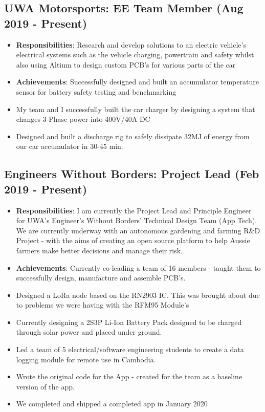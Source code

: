 \documentclass{article}[a4page]
\begin{document}
\subsection*{UWA Motorsports: EE Team Member \hfill (Aug 2019 - Present)}
\begin{itemize}
\item \textbf{Responsibilities}: Research and develop solutions to an electric vehicle’s electrical systems such as the vehicle charging, powertrain and safety whilst also using Altium to design custom PCB’s for various parts of the car
\item \textbf{Achievements}: Successfully designed and built an accumulator temperature sensor for battery safety testing and benchmarking
\item My team and I successfully built the car charger by designing a system that changes 3 Phase power into 400V/40A DC
\item Designed and built a discharge rig to safely dissipate 32MJ of energy from our car accumulator in 30-45 min.
\end{itemize}

\subsection*{Engineers Without Borders: Project Lead \hfill (Feb 2019 - Present)}
\begin{itemize}
\item \textbf{Responsibilities}: I am currently the Project Lead and Principle Engineer for UWA's Engineer's Without Borders' Technical Design Team (App Tech). We are currently underway with an autonomous gardening and farming R\&D Project - with the aims of creating an open source platform to help Aussie farmers make better decisions and manage their risk. 
\item \textbf{Achievements}: Currently co-leading a team of 16 members - taught them to successfully design, manufacture and assemble PCB's. 
\item Designed a LoRa node based on the RN2903 IC. This was brought about due to problems we were having with the RFM95 Module's
\item Currently designing a 2S3P Li-Ion Battery Pack designed to be charged through solar power and placed under ground.
\item Led a team of 5 electrical/software engineering students to create a data logging module for remote use in Cambodia.
\item Wrote the original code for the App - created for the team as a baseline version of the app. 
\item We completed and shipped a completed app in January 2020
\end{itemize}
\end{document}
